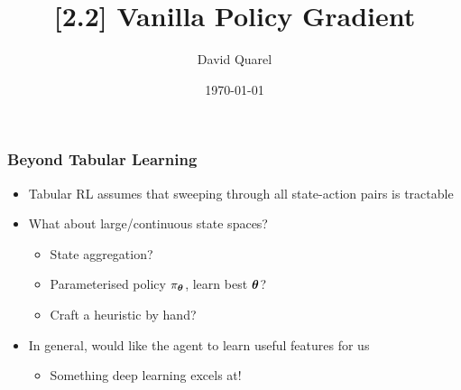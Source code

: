 


\newcommand{\R}{\mathcal{R}}
\renewcommand{\S}{\mathcal{S}}
\newcommand{\A}{\mathcal{A}}
\renewcommand{\Pr}{\text{Pr}}
\renewcommand{\P}{\text{P}}
\newcommand{\iter}{\xrightarrow{I}}
\newcommand{\eval}{\xrightarrow{E}}
\newcommand{\iver}[1]{\llbracket {#1} \rrbracket}
\newcommand{\biject}{\langle \cdot \rangle}
\newcommand{\bij}[1]{\langle {#1} \rangle}
\newcommand{\pth}{{\boldsymbol{\phi}}}
\newcommand{\eps}{\epsilon}
\newcommand{\eplen}{T}
\newcommand{\env}{\mu}





\title[{[2.2] Vanilla Policy Gradient}]
{{[2.2] Vanilla Policy Gradient}}

 
\author[David Quarel] %
{David Quarel}
 
 
\date[\today] %
{\today}
 
\frame{\titlepage}


\begin{frame}
	\frametitle{Beyond Tabular Learning}
	
\begin{itemize}
	\item Tabular RL assumes that sweeping through
	all state-action pairs is tractable
	\pause
	\item What about large/continuous state spaces?
	\begin{itemize}
		\item State aggregation?
		\item Parameterised policy $\pi_{\boldsymbol{\theta}}$, learn best ${\boldsymbol{\theta}}$?
		\item Craft a heuristic by hand?
	\end{itemize}
	\item In general, would like the agent to learn useful features for us
	\pause
	\begin{itemize}
		\item Something deep learning excels at!
	\end{itemize}
\end{itemize}
\end{frame}

